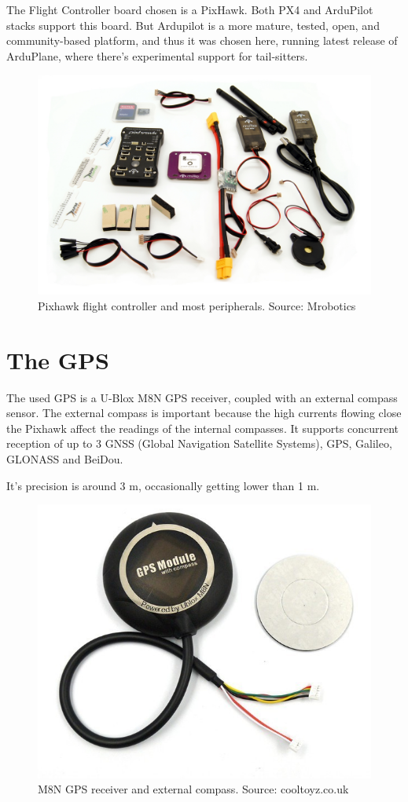 The Flight Controller board chosen is a PixHawk. Both PX4 and ArduPilot stacks support this board. But Ardupilot is a more mature, tested, open, and community-based platform, and thus it was chosen here, running latest release of ArduPlane, where there's experimental support for tail-sitters.

\begin{figure}[H]
\centering
  \includegraphics[width=0.8\linewidth]{figs/pixhawk.jpg}
  \caption{Pixhawk flight controller and most peripherals. Source: Mrobotics}
  \label{fig:pixhawk}
\end{figure}

\section{The GPS}
The used GPS is a U-Blox M8N GPS receiver, coupled with an external compass sensor. The external compass is important because the high currents flowing close the Pixhawk affect the readings of the internal compasses.
%
It supports concurrent reception of up to 3 GNSS (Global Navigation Satellite Systems), GPS, Galileo, GLONASS and BeiDou.

It's precision is around 3 m, occasionally getting lower than 1 m\cite{m8ntest}.

\begin{figure}[H]
\centering
  \includegraphics[width=0.8\linewidth]{figs/m8n.jpg}
  \caption{M8N GPS receiver and external compass. Source: cooltoyz.co.uk}
  \label{fig:m8n}
\end{figure}


